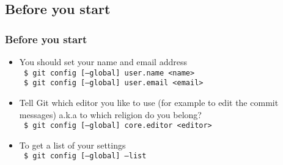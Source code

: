 \documentclass{beamer}
\begin{document}
\subsection{Before you start}
\begin{frame}
  \frametitle{Before you start}
  \begin{itemize}
    \item You should set your name and email address\\
      {\tt\ \$ git config [--global] user.name <name>}\\
      {\tt\ \$ git config [--global] user.email <email>}
    \item<2-> Tell Git which editor you like to use (for example to edit the commit messages)
      {\tiny a.k.a to which religion do you belong?}\\
			{\tt\ \$ git config [--global] core.editor <editor>}
		\item<3-> To get a list of your settings\\
			{\tt\ \$ git config [--global] --list}
  \end{itemize}
\end{frame}
\end{document}
